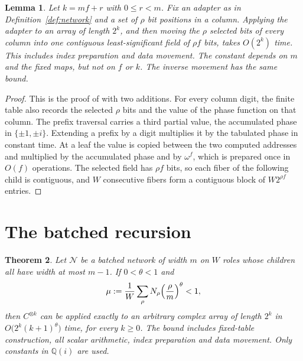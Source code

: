 \documentclass[11pt]{article}
\newtheorem{theorem}{Theorem}[section]
\newtheorem{lemma}[theorem]{Lemma}
\theoremstyle{definition}
\begin{document}
\begin{lemma}\label{lem:address}
Let $k=mf+r$ with $0\le r<m$. Fix an adapter as in
Definition~\ref{def:network} and a set of $\rho$ bit positions in a column.
Applying the adapter to an array of length $2^k$, and then moving the $\rho$
selected bits of every column into one contiguous least-significant field of
$\rho f$ bits, takes $O(2^k)$ time. This includes index preparation and data
movement. The constant depends on $m$ and the fixed maps, but not on $f$ or $k$.
The inverse movement has the same bound.
\end{lemma}

\begin{proof}
This is the proof of \cite[Lemma~2.5]{oai-dft} with two additions. For every
column digit, the finite table also records the selected $\rho$ bits and the
value of the phase function on that column. The prefix traversal carries a
third partial value, the accumulated phase in $\{\pm1,\pm i\}$. Extending a
prefix by a digit multiplies it by the tabulated phase in constant time. At a
leaf the value is copied between the two computed addresses and multiplied by
the accumulated phase and by $\omega^f$, which is prepared once in $O(f)$
operations. The selected field has $\rho f$ bits, so each
fiber of the following child is contiguous, and $W$ consecutive fibers form a
contiguous block of $W2^{\rho f}$ entries.
\end{proof}

\section{The batched recursion}
\begin{theorem}\label{thm:batched}
Let $\mathcal N$ be a batched network of width $m$ on $W$ roles whose children
all have width at most $m-1$. If $0<\theta<1$ and
\[
 \mu:=\frac1W\sum_{\rho}N_\rho\Bigl(\frac\rho m\Bigr)^{\theta}<1,
\]
then $C^{\otimes k}$ can be applied exactly to an arbitrary complex array of
length $2^k$ in $O\bigl(2^k(k+1)^\theta\bigr)$ time, for every $k\ge0$. The
bound includes fixed-table construction, all scalar arithmetic, index
preparation and data movement. Only constants in $\mathbb Q(i)$ are used.
\end{theorem}
\end{document}
